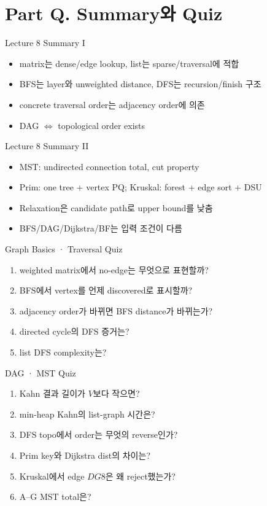 \section{Part Q. Summary와 Quiz}
\begin{frame}{Lecture 8 Summary I}
\begin{itemize}\item matrix는 dense/edge lookup, list는 sparse/traversal에 적합\item BFS는 layer와 unweighted distance, DFS는 recursion/finish 구조\item concrete traversal order는 adjacency order에 의존\item DAG \(\Longleftrightarrow\) topological order exists\end{itemize}
\end{frame}
\begin{frame}{Lecture 8 Summary II}
\begin{itemize}\item MST: undirected connection total, cut property\item Prim: one tree + vertex PQ; Kruskal: forest + edge sort + DSU\item Relaxation은 candidate path로 upper bound를 낮춤\item BFS/DAG/Dijkstra/BF는 입력 조건이 다름\end{itemize}
\end{frame}
\begin{frame}{Graph Basics · Traversal Quiz}
\small\begin{enumerate}\item weighted matrix에서 no-edge는 무엇으로 표현할까?\item BFS에서 vertex를 언제 discovered로 표시할까?\item adjacency order가 바뀌면 BFS distance가 바뀌는가?\item directed cycle의 DFS 증거는?\item list DFS complexity는?\end{enumerate}
\end{frame}
\begin{frame}{DAG · MST Quiz}
\scriptsize\begin{enumerate}\item Kahn 결과 길이가 \(V\)보다 작으면?\item min-heap Kahn의 list-graph 시간은?\item DFS topo에서 order는 무엇의 reverse인가?\item Prim key와 Dijkstra dist의 차이는?\item Kruskal에서 edge \(DG8\)은 왜 reject했는가?\item A--G MST total은?\end{enumerate}
\end{frame}
